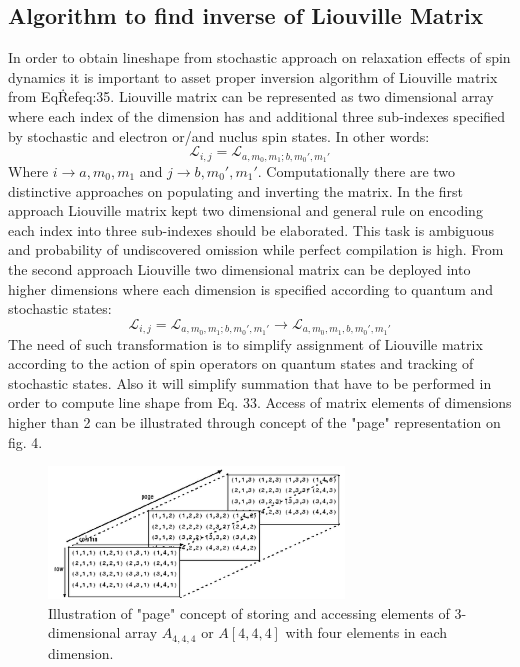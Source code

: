 \subsection{Algorithm to find inverse of Liouville Matrix}\label{algorithmsection}
In order to obtain lineshape from stochastic approach on relaxation effects of spin dynamics it is important to asset proper inversion algorithm of Liouville matrix from Eq\.Ref{eq:35}. Liouville matrix can be represented as two dimensional array where each index of the dimension has and additional three sub-indexes specified by stochastic and electron or/and nuclus spin states. In other words: 
\begin{equation}\label{eq:53}
\mathcal{L}_{i,j}=\mathcal{L}_{a,m_0,m_1;b,m_0',m_1'}  
\end{equation}  
Where $i\rightarrow a,m_0,m_1$ and $j\rightarrow b,m_0',m_1'$. Computationally there are two distinctive approaches on populating and inverting the matrix. In the first approach Liouville matrix kept two dimensional and general rule on encoding each index into three sub-indexes should be elaborated. This task is ambiguous and probability of undiscovered omission while perfect compilation is high. From the second approach Liouville two dimensional matrix can be deployed into higher dimensions where each dimension is specified according to quantum and stochastic states:  
\begin{equation}\label{eq:54}
\mathcal{L}_{i,j}=\mathcal{L}_{a,m_0,m_1;b,m_0',m_1'}\rightarrow \mathcal{L}_{a,m_0,m_1,b,m_0',m_1'}
\end{equation}
The need of such transformation is to simplify assignment of Liouville matrix according to the action of spin operators on quantum states and tracking of stochastic states. Also it will simplify summation that have to be performed in order to compute line shape from Eq. 33. Access of matrix elements of dimensions higher than 2 can be illustrated through concept of the "page" representation on fig. 4. 
\begin{figure}[h!]
\centering
\includegraphics[width=0.7\textwidth]{figures/chap1/mat.png}
\caption{Illustration of "page" concept of storing and accessing elements of 3-dimensional array $A_{4,4,4}$ or $A[4,4,4]$ with four elements in each dimension.~\cite{Matlab}}
\end{figure}
